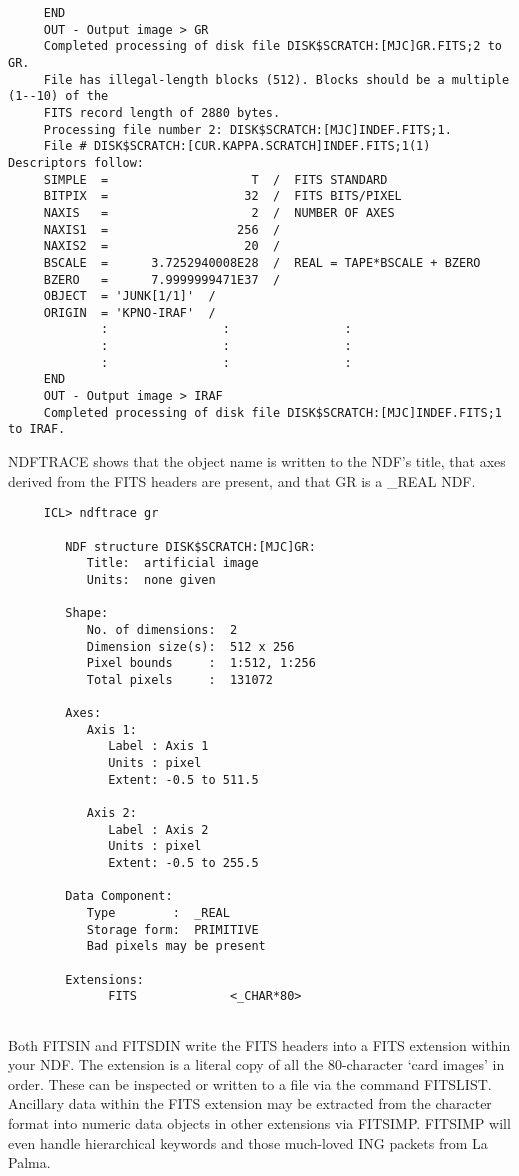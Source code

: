 {\begin{verbatim}
     END
     OUT - Output image > GR
     Completed processing of disk file DISK$SCRATCH:[MJC]GR.FITS;2 to GR.
     File has illegal-length blocks (512). Blocks should be a multiple (1--10) of the
     FITS record length of 2880 bytes.
     Processing file number 2: DISK$SCRATCH:[MJC]INDEF.FITS;1.
     File # DISK$SCRATCH:[CUR.KAPPA.SCRATCH]INDEF.FITS;1(1)  Descriptors follow:
     SIMPLE  =                    T  /  FITS STANDARD
     BITPIX  =                   32  /  FITS BITS/PIXEL
     NAXIS   =                    2  /  NUMBER OF AXES
     NAXIS1  =                  256  /
     NAXIS2  =                   20  /
     BSCALE  =      3.7252940008E28  /  REAL = TAPE*BSCALE + BZERO
     BZERO   =      7.9999999471E37  /
     OBJECT  = 'JUNK[1/1]'  /
     ORIGIN  = 'KPNO-IRAF'  /
             :                :                :
             :                :                :
             :                :                :
     END
     OUT - Output image > IRAF
     Completed processing of disk file DISK$SCRATCH:[MJC]INDEF.FITS;1 to IRAF.
\end{verbatim}
\normalsize
NDFTRACE shows that the object name is written to the NDF's
title, that axes derived from the FITS headers are present,
and that GR is a \_REAL NDF.

\small
\begin{verbatim}
     ICL> ndftrace gr
 
        NDF structure DISK$SCRATCH:[MJC]GR:
           Title:  artificial image
           Units:  none given
 
        Shape:
           No. of dimensions:  2
           Dimension size(s):  512 x 256
           Pixel bounds     :  1:512, 1:256
           Total pixels     :  131072
 
        Axes:
           Axis 1:
              Label : Axis 1
              Units : pixel
              Extent: -0.5 to 511.5
 
           Axis 2:
              Label : Axis 2
              Units : pixel
              Extent: -0.5 to 255.5
 
        Data Component:
           Type        :  _REAL
           Storage form:  PRIMITIVE
           Bad pixels may be present
 
        Extensions:
              FITS             <_CHAR*80>
 
\end{verbatim}
\normalsize
Both FITSIN and FITSDIN write the FITS headers into a FITS extension
within your NDF.  The extension is a literal copy of all the 80-character
`card images' in order. These can be inspected or written to a file via
the command FITSLIST.  Ancillary data within the FITS extension may
be extracted from the character format into numeric data objects in
other extensions via FITSIMP.  FITSIMP will even handle hierarchical
keywords and those much-loved ING packets from La Palma.

}

